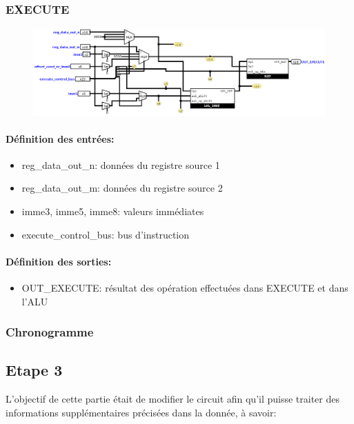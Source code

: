 \documentclass[a4paper]{article} %
\begin{document}
\subsubsection{EXECUTE} \label{execute}
\begin{figure}[H]
    \centering
    \includegraphics[width=1\textwidth]{src/EXECUTE.png}
    \label{fig:execute_pic}
\end{figure}
\paragraph{Définition des entrées:}
\begin{itemize}
    \item     reg\_data\_out\_n: données du registre source 1
    \item     reg\_data\_out\_m: données du registre source 2
    \item     imme3, imme5, imme8: valeurs immédiates
    \item     execute\_control\_bus: bus d'instruction
\end{itemize}

\paragraph{Définition des sorties:}
\begin{itemize}
    \item     OUT\_EXECUTE: résultat des opération effectuées dans EXECUTE et dans l'ALU
\end{itemize}
\medskip

\subsubsection{Chronogramme}

\subsection{Etape 3}
L'objectif de cette partie était de modifier le circuit afin qu'il puisse traiter des informations supplémentaires précisées dans la donnée, à savoir:
\medskip
\end{document}
